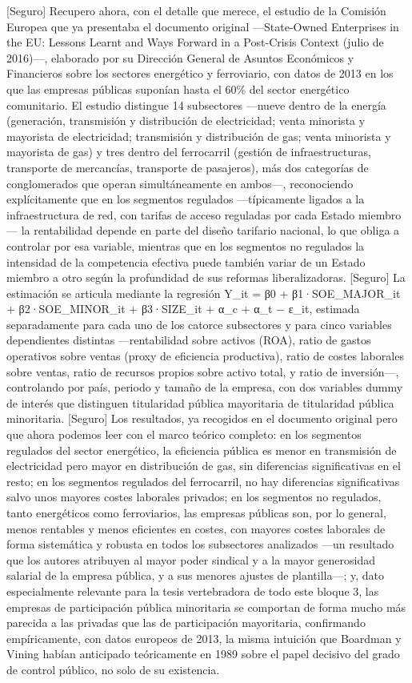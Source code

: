 \documentclass[10pt,a4paper]{article}
\begin{document}
[Seguro] Recupero ahora, con el detalle que merece, el estudio de la Comisión Europea que ya presentaba el documento original —State-Owned Enterprises in the EU: Lessons Learnt and Ways Forward in a Post-Crisis Context (julio de 2016)—, elaborado por su Dirección General de Asuntos Económicos y Financieros sobre los sectores energético y ferroviario, con datos de 2013 en los que las empresas públicas suponían hasta el 60\% del sector energético comunitario. El estudio distingue 14 subsectores —nueve dentro de la energía (generación, transmisión y distribución de electricidad; venta minorista y mayorista de electricidad; transmisión y distribución de gas; venta minorista y mayorista de gas) y tres dentro del ferrocarril (gestión de infraestructuras, transporte de mercancías, transporte de pasajeros), más dos categorías de conglomerados que operan simultáneamente en ambos—, reconociendo explícitamente que en los segmentos regulados —típicamente ligados a la infraestructura de red, con tarifas de acceso reguladas por cada Estado miembro— la rentabilidad depende en parte del diseño tarifario nacional, lo que obliga a controlar por esa variable, mientras que en los segmentos no regulados la intensidad de la competencia efectiva puede también variar de un Estado miembro a otro según la profundidad de sus reformas liberalizadoras. [Seguro] La estimación se articula mediante la regresión Y_it = β0 + β1·SOE_MAJOR_it + β2·SOE_MINOR_it + β3·SIZE_it + α_c + α_t − ε_it, estimada separadamente para cada uno de los catorce subsectores y para cinco variables dependientes distintas —rentabilidad sobre activos (ROA), ratio de gastos operativos sobre ventas (proxy de eficiencia productiva), ratio de costes laborales sobre ventas, ratio de recursos propios sobre activo total, y ratio de inversión—, controlando por país, periodo y tamaño de la empresa, con dos variables dummy de interés que distinguen titularidad pública mayoritaria de titularidad pública minoritaria. [Seguro] Los resultados, ya recogidos en el documento original pero que ahora podemos leer con el marco teórico completo: en los segmentos regulados del sector energético, la eficiencia pública es menor en transmisión de electricidad pero mayor en distribución de gas, sin diferencias significativas en el resto; en los segmentos regulados del ferrocarril, no hay diferencias significativas salvo unos mayores costes laborales privados; en los segmentos no regulados, tanto energéticos como ferroviarios, las empresas públicas son, por lo general, menos rentables y menos eficientes en costes, con mayores costes laborales de forma sistemática y robusta en todos los subsectores analizados —un resultado que los autores atribuyen al mayor poder sindical y a la mayor generosidad salarial de la empresa pública, y a sus menores ajustes de plantilla—; y, dato especialmente relevante para la tesis vertebradora de todo este bloque 3, las empresas de participación pública minoritaria se comportan de forma mucho más parecida a las privadas que las de participación mayoritaria, confirmando empíricamente, con datos europeos de 2013, la misma intuición que Boardman y Vining habían anticipado teóricamente en 1989 sobre el papel decisivo del grado de control público, no solo de su existencia.
\end{document}
